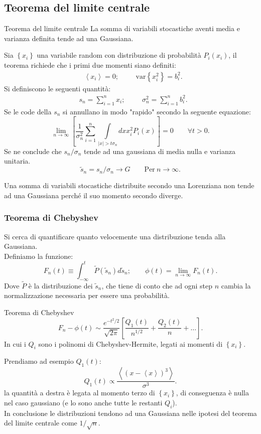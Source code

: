 \subsection{Teorema del limite centrale}%
\label{sub:Teorema del limite centrale}
\begin{redbox}{Teorema del limite centrale}
   La somma di variabili stocastiche aventi media e varianza definita tende ad una Gaussiana. 
\end{redbox}
\noindent
Sia $\left\{x_i\right\}$ una variabile random con distribuzione di probabilità $P_i(x_i)$, il teorema richiede che i primi due momenti siano definiti:
\[\begin{aligned}
    & \left<x_i\right> = 0; &&
    & \text{var}\left\{x_i^2\right\} = b_i^2
.\end{aligned}\]
Si definiscono le seguenti quantità:
\[\begin{aligned}
    & s_n = \sum_{i=1}^{n} x_i;
    &&
    &\sigma_n^2 = \sum_{i=1}^{n} b_i^2
.\end{aligned}\]
Se le code della $s_n$ si annullano in modo "rapido" secondo la seguente equazione:
\[
    \lim_{n \to \infty} 
    \left[\frac{1}{\sigma_n^2} \sum_{i=1}^{n} \int\limits_{\left|x\right|>t\sigma_n}^{} dx x^2_i P_i(x)  \right] 
    = 0 \qquad \forall t>0
.\] 
Se ne conclude che $s_n/\sigma_n$ tende ad una gaussiana di media nulla e varianza unitaria.
\[
    \tilde{s}_n = s_n /\sigma_n \to G \qquad \mbox{Per} \ n \to \infty
.\] 
\begin{exmp}
    Una somma di variabili stocastiche distribuite secondo una Lorenziana non tende ad una Gaussiana perché il suo momento secondo diverge.
\end{exmp}
\noindent
\subsubsection{Teorema di Chebyshev}%
\label{subsub:Teorema di Chebyshev}
Si cerca di quantificare quanto velocemente una distribuzione tenda alla Gaussiana.\\
Definiamo la funzione:
\[
    F_n(t) \equiv \int_{-\infty}^{t} \tilde{P}(\tilde{s}_n)d\tilde{s}_n;  \qquad \phi (t) = \lim_{n \to \infty} F_n(t) 
.\] 
Dove $\tilde{P}$ è la distribuzione dei $\tilde{s}_n$, che tiene di conto che ad ogni step $n$ cambia la normalizzazione necessaria per essere una probabilità.
\begin{redbox}{Teorema di Chebyshev}
    \[
	F_n-\phi (t) \sim \frac{e^{-t^2 /2}}{\sqrt{2\pi}}\left[\frac{Q_1(t)}{n^{1 /2}} + \frac{Q_2(t)}{n} + \ldots\right]
    .\] 
    In cui i $Q_i$ sono i polinomi di Chebyshev-Hermite, legati ai momenti di $\left\{x_i\right\}$.
\end{redbox}
\noindent
Prendiamo ad esempio $Q_1(t)$:
\[
    Q_1(t) \propto \frac{\left<\left(x-\left<x\right>\right)^3\right>}{\sigma^3}
.\] 
la quantità a destra è legata al momento terzo di $\left\{x_i\right\}$, di conseguenza è nulla nel caso gaussiano (e lo sono anche tutte le restanti $Q_i$).\\
In conclusione le distribuzioni tendono ad una Gaussiana nelle ipotesi del teorema del limite centrale come $1 / \sqrt{n} $.

